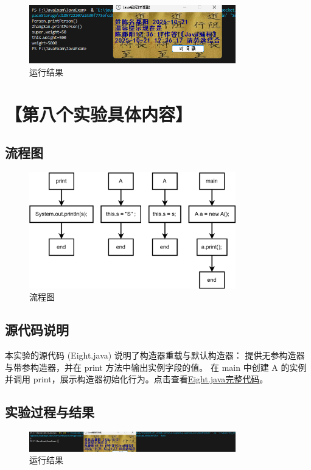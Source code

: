 \documentclass[12pt,a4paper]{article}
\begin{document}
\begin{figure}[H]
\centering
\includegraphics[width=0.8\textwidth,height=0.8\textheight,keepaspectratio]{sevena.png}
\caption{运行结果}
\end{figure}

\section*{【第八个实验具体内容】}
\subsection*{流程图}

\begin{figure}[H]
\centering
\includegraphics[width=0.8\textwidth,height=0.8\textheight,keepaspectratio]{eighta1.png}
\caption{流程图}
\end{figure}

\subsection*{源代码说明}
本实验的源代码 (Eight.java) 说明了构造器重载与默认构造器：
提供无参构造器与带参构造器，并在 print 方法中输出实例字段的值。
在 main 中创建 A 的实例并调用 print，展示构造器初始化行为。点击查看\hyperref[sec:eight]{Eight.java完整代码}。

\subsection*{实验过程与结果}

\begin{figure}[H]
\centering
\includegraphics[width=0.8\textwidth,height=0.8\textheight,keepaspectratio]{eighta.png}
\caption{运行结果}
\end{figure}
\end{document}
